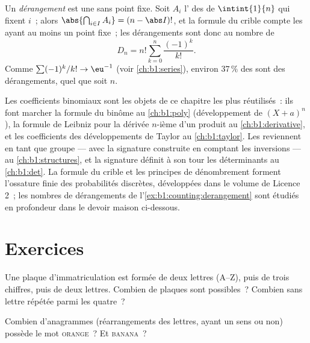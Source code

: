 \begin{example}[Dérangements]\label{ex:b1:counting:derangement}
Un \emph{dérangement} est une  sans point fixe. Soit $A_i$
l' des  de $\intint{1}{n}$ qui fixent $i$~;
alors $\abs{\bigcap_{i \in I} A_i} = (n - \abs I)!$, et la formule du
crible compte les  ayant au moins un point fixe~; les
dérangements sont donc au nombre de
\[
D_n = n! \sum_{k=0}^{n} \frac{(-1)^k}{k!} .
\]
Comme $\sum (-1)^k / k! \to \eu^{-1}$ (voir \cref{ch:b1:series}), environ
$37\,\%$ des  sont des dérangements, quel que soit $n$.
\end{example}

\begin{remark}\label{rem:b1:counting:whereused}
Les coefficients binomiaux sont les objets de ce chapitre les plus
réutilisés~: ils font marcher la formule du binôme au \cref{ch:b1:poly}
(développement de $(X + a)^n$), la formule de Leibniz pour la dérivée
$n$-ième d'un produit au \cref{ch:b1:derivative}, et les coefficients
des développements de Taylor au \cref{ch:b1:taylor}.
Les  reviennent en tant que groupe --- avec la signature
construite en comptant les inversions --- au \cref{ch:b1:structures}, et
la signature définit à son tour les déterminants au \cref{ch:b1:det}.
La formule du crible et les principes de dénombrement forment l'ossature
finie des probabilités discrètes, développées dans le volume de Licence 2~;
les nombres de dérangements de l'\cref{ex:b1:counting:derangement} sont
étudiés en profondeur dans le devoir maison ci-dessous.
\end{remark}

\section{Exercices}

\begin{exercise}[$\star$]\label{exo:b1:counting:1}
Une plaque d'immatriculation est formée de deux lettres (A--Z), puis de
trois chiffres, puis de deux lettres. Combien de plaques sont possibles~?
Combien sans lettre répétée parmi les quatre~?
\end{exercise}

\begin{exercise}[$\star$]\label{exo:b1:counting:2}
Combien d'anagrammes (réarrangements des lettres, ayant un sens ou non)
possède le mot \textsc{orange}~? Et \textsc{banana}~?
\end{exercise}

